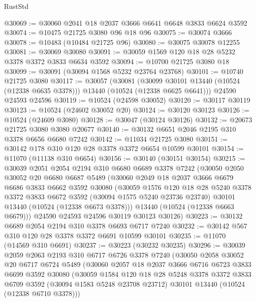 \begin{lexlean}{RustStd}
\begin{coremodule}
@30069 := @30060 @2041 @18 @2037 @3666 @6641 @6648 @3833 @6624 @3592
@30074 := @10475 @21725 @3080 @96 @18 @96
@30075 := @30074 @3666
@30078 := @10483 (@10484 @21725 @96)
@30080 := @30075 @30078 @12255
@30081 := @30069 @30080
@30091 := @30059 @1569 @120 @18 @28 @5232 @3378 @3372 @3833 @6634 @3592
@30094 := @10700 @21725 @3080 @18
@30099 := @30091 (@30094 @1568 @5232 @23764 @23768)
@30101 := @10740 @21725 @3080
@30117 := @30057
    (@30081
      (@30099 @30101 @13440 (@10524 (@12338 @6635 @3378)))
      @13440
      (@10524 (@12338 @6625 @6641)))
    @24590
    @24593
    @24596
@30119 := @10524 (@24598 @30052)
@30120 := @30117 @30119
@30123 := @10524 (@24602 @30052 @20)
@30124 := @30120 @30123
@30126 := @10524 (@24609 @3080)
@30128 := @30047 (@30124 @30126)
@30132 := @20673 @21725 @3080 @3080 @20677
@30140 := @30132 @6651 @2046 @2195 @310 @3378 @6656 @6680 @7242
@30142 := @11034 @21725 @3080
@30151 := @30142 @178 @310 @120 @28 @3378 @3372 @6654 @10599 @30101
@30154 := @11070 (@11138 @310 @6654)
@30156 := @30140 (@30151 @30154)
@30215 := @30039
    @2051
    @2054
    @2194
    @310
    @6680
    @6689
    @3378
    @7242
    (@30050
      @2050
      @30052
      @20
      @6680
      @6687
      @5489
      (@30060
        @2049
        @18
        @2037
        @3666
        @6679
        @6686
        @3833
        @6662
        @3592
        @30080
        (@30059
          @1576
          @120
          @18
          @28
          @5240
          @3378
          @3372
          @3833
          @6672
          @3592
          (@30094 @1575 @5240 @23736 @23740)
          @30101
          @13440
          (@10524 (@12338 @6673 @3378)))
        @13440
        (@10524 (@12338 @6663 @6679)))
      @24590
      @24593
      @24596
      @30119
      @30123
      @30126)
@30223 := @30132 @6689 @2054 @2194 @310 @3378 @6693 @6717 @7240
@30232 := @30142 @567 @310 @120 @28 @3378 @3372 @6691 @10599 @30101
@30235 := @11070 (@14569 @310 @6691)
@30237 := @30223 (@30232 @30235)
@30296 := @30039
    @2059
    @2063
    @2193
    @310
    @6717
    @6726
    @3378
    @7240
    (@30050
      @2058
      @30052
      @20
      @6717
      @6724
      @5489
      (@30060
        @2057
        @18
        @2037
        @3666
        @6716
        @6723
        @3833
        @6699
        @3592
        @30080
        (@30059
          @1584
          @120
          @18
          @28
          @5248
          @3378
          @3372
          @3833
          @6709
          @3592
          (@30094 @1583 @5248 @23708 @23712)
          @30101
          @13440
          (@10524 (@12338 @6710 @3378)))

\end{coremodule}
\end{lexlean}
